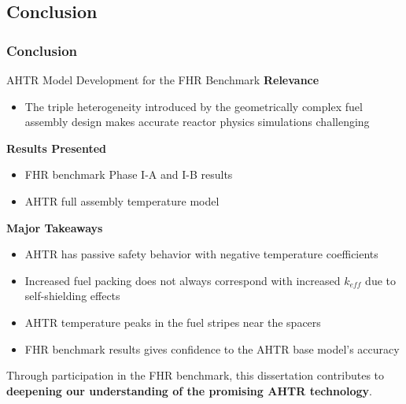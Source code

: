 \subsection{Conclusion}
\begin{frame}
    \frametitle{Conclusion}
    \begin{block}{AHTR Model Development for the FHR Benchmark}
        \small
        \textbf{Relevance}
        \begin{itemize}
            \item The triple heterogeneity introduced by the geometrically complex 
            fuel assembly design makes accurate reactor physics simulations challenging
        \end{itemize}
        \textbf{Results Presented} 
        \begin{itemize}
            \item FHR benchmark Phase I-A and I-B results
            \item AHTR full assembly temperature model 
        \end{itemize}
        \textbf{Major Takeaways} 
        \begin{itemize}
            \item AHTR has passive safety behavior with negative temperature coefficients
            \item Increased fuel packing does not always correspond with increased 
            $k_{eff}$ due to self-shielding effects 
            \item AHTR temperature peaks in the fuel stripes near the spacers 
            \item FHR benchmark results gives confidence to the AHTR base model's accuracy
        \end{itemize}
    \end{block}

    Through participation in the FHR benchmark, this dissertation contributes to 
    \textbf{deepening our understanding of the promising \gls{AHTR} technology}. 
\end{frame}

